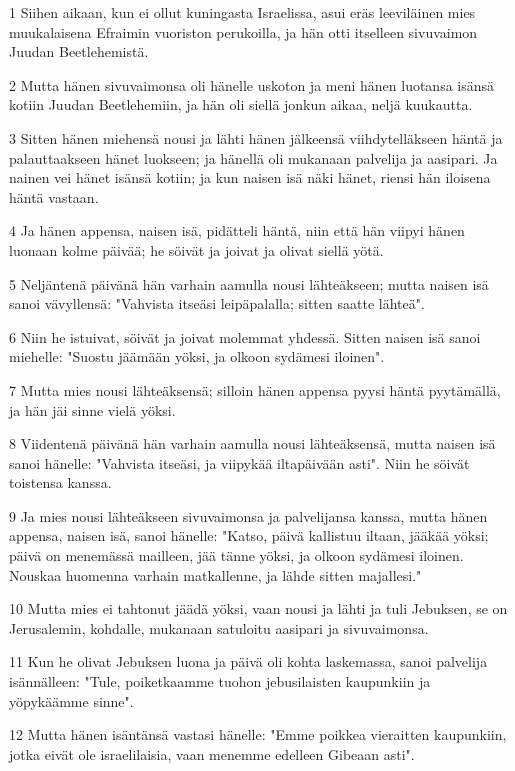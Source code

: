 \par 1 Siihen aikaan, kun ei ollut kuningasta Israelissa, asui eräs leeviläinen mies muukalaisena Efraimin vuoriston perukoilla, ja hän otti itselleen sivuvaimon Juudan Beetlehemistä.
\par 2 Mutta hänen sivuvaimonsa oli hänelle uskoton ja meni hänen luotansa isänsä kotiin Juudan Beetlehemiin, ja hän oli siellä jonkun aikaa, neljä kuukautta.
\par 3 Sitten hänen miehensä nousi ja lähti hänen jälkeensä viihdytelläkseen häntä ja palauttaakseen hänet luokseen; ja hänellä oli mukanaan palvelija ja aasipari. Ja nainen vei hänet isänsä kotiin; ja kun naisen isä näki hänet, riensi hän iloisena häntä vastaan.
\par 4 Ja hänen appensa, naisen isä, pidätteli häntä, niin että hän viipyi hänen luonaan kolme päivää; he söivät ja joivat ja olivat siellä yötä.
\par 5 Neljäntenä päivänä hän varhain aamulla nousi lähteäkseen; mutta naisen isä sanoi vävyllensä: "Vahvista itseäsi leipäpalalla; sitten saatte lähteä".
\par 6 Niin he istuivat, söivät ja joivat molemmat yhdessä. Sitten naisen isä sanoi miehelle: "Suostu jäämään yöksi, ja olkoon sydämesi iloinen".
\par 7 Mutta mies nousi lähteäksensä; silloin hänen appensa pyysi häntä pyytämällä, ja hän jäi sinne vielä yöksi.
\par 8 Viidentenä päivänä hän varhain aamulla nousi lähteäksensä, mutta naisen isä sanoi hänelle: "Vahvista itseäsi, ja viipykää iltapäivään asti". Niin he söivät toistensa kanssa.
\par 9 Ja mies nousi lähteäkseen sivuvaimonsa ja palvelijansa kanssa, mutta hänen appensa, naisen isä, sanoi hänelle: "Katso, päivä kallistuu iltaan, jääkää yöksi; päivä on menemässä mailleen, jää tänne yöksi, ja olkoon sydämesi iloinen. Nouskaa huomenna varhain matkallenne, ja lähde sitten majallesi."
\par 10 Mutta mies ei tahtonut jäädä yöksi, vaan nousi ja lähti ja tuli Jebuksen, se on Jerusalemin, kohdalle, mukanaan satuloitu aasipari ja sivuvaimonsa.
\par 11 Kun he olivat Jebuksen luona ja päivä oli kohta laskemassa, sanoi palvelija isännälleen: "Tule, poiketkaamme tuohon jebusilaisten kaupunkiin ja yöpykäämme sinne".
\par 12 Mutta hänen isäntänsä vastasi hänelle: "Emme poikkea vieraitten kaupunkiin, jotka eivät ole israelilaisia, vaan menemme edelleen Gibeaan asti".

